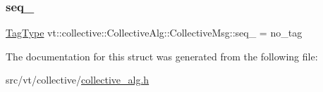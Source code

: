 \subsubsection{\texorpdfstring{seq\+\_\+}{seq\_}}
{\footnotesize\ttfamily \hyperlink{namespacevt_a84ab281dae04a52a4b243d6bf62d0e52}{Tag\+Type} vt\+::collective\+::\+Collective\+Alg\+::\+Collective\+Msg\+::seq\+\_\+ = no\+\_\+tag}



The documentation for this struct was generated from the following file\+:\begin{DoxyCompactItemize}
\item 
src/vt/collective/\hyperlink{collective__alg_8h}{collective\+\_\+alg.\+h}\end{DoxyCompactItemize}
